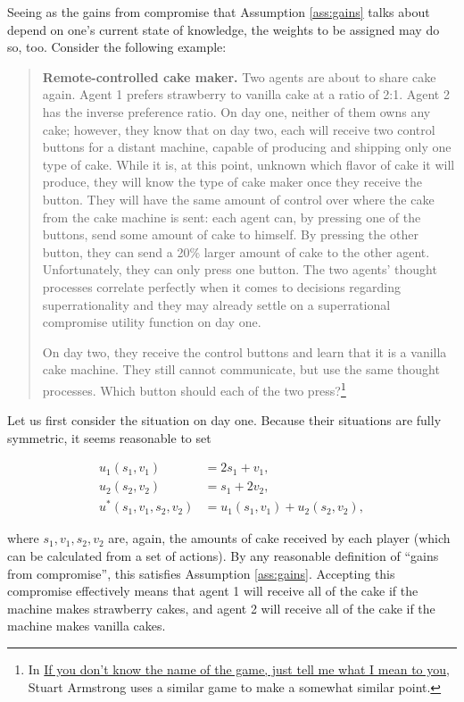 Seeing as the gains from compromise that Assumption \ref{ass:gains} talks about depend
on one's current state of knowledge, the weights to be assigned may do
so, too. Consider the following example:

\begin{quote}
\textbf{Remote-controlled cake maker.} Two agents are about to share
cake again. Agent 1 prefers strawberry to vanilla cake at a ratio of
2:1. Agent 2 has the inverse preference ratio. On day one, neither of
them owns any cake; however, they know that on day two, each will
receive two control buttons for a distant machine, capable of producing
and shipping only one type of cake. While it is, at this point, unknown
which flavor of cake it will produce, they will know the type of cake
maker once they receive the button. They will have the same amount of
control over where the cake from the cake machine is sent: each agent
can, by pressing one of the buttons, send some amount of cake to
himself. By pressing the other button, they can send a 20\% larger
amount of cake to the other agent. Unfortunately, they can only press
one button. The two agents' thought processes correlate perfectly when
it comes to decisions regarding superrationality and they may already
settle on a superrational compromise utility function on day one.

On day two, they receive the control buttons and learn that it is a
vanilla cake machine. They still cannot communicate, but use the same
thought processes. Which button should each of the two press?\footnote{In
  \href{http://lesswrong.com/lw/2xb/if_you_dont_know_the_name_of_the_game_just_tell/}{If
  you don't know the name of the game, just tell me what I mean to
  you}, Stuart Armstrong uses a similar game to make a somewhat
  similar point.}
\end{quote}

Let us first consider the situation on day one. Because their situations
are fully symmetric, it seems reasonable to set

\begin{align*}
u_{1}(s_{1},v_{1}) &= 2s_{1} + v_{1},\\
u_{2}(s_{2},v_{2}) &= s_{1} + {2v}_{2},\\
u^{*}(s_{1},v_{1},s_{2},v_{2}) &= u_{1}(s_{1},v_{1}) + u_{2}(s_{2},v_{2}),
\end{align*}

where \(s_{1},v_{1},s_{2},v_{2}\) are, again, the amounts of cake
received by each player (which can be calculated from a set of actions).
By any reasonable definition of ``gains from compromise'', this
satisfies Assumption \ref{ass:gains}. Accepting this compromise effectively means that
agent 1 will receive all of the cake if the machine makes strawberry
cakes, and agent 2 will receive all of the cake if the machine makes
vanilla cakes.

